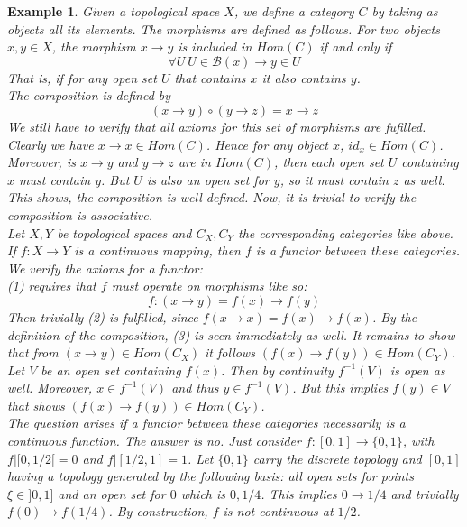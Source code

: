 \documentclass[17pt]{extarticle}
\newtheorem{example}{Example}
\begin{document}
\begin{example}
	Given a topological space $X$, we define a category $C$ by taking as objects all its elements.
	The morphisms are defined as follows. For two objects $x,y\in X$, the morphism $x\rightarrow y$ is included in
	$Hom(C)$ if and only if 
	$$\forall U \ U\in \mathcal{B}(x) \rightarrow y\in U$$
	That is, if for any open set $U$ that contains $x$ it also contains $y$.\\
	The composition is defined by
	$$(x\rightarrow y)\circ (y\rightarrow z) = x\rightarrow z$$
	We still have to verify that all axioms for this set of morphisms are fufilled.\\
	Clearly we have $x\rightarrow x\in Hom(C)$. Hence for any object $x$, $id_x\in Hom(C)$. 
	Moreover, is $x\rightarrow y$ and $y\rightarrow z$ are in $Hom(C)$, then each open set $U$ containing $x$ must
	contain $y$. But $U$ is also an open set for $y$, so it must contain $z$ as well. This shows, the composition is well-defined. Now, it is trivial to verify the composition is associative.\\
	Let $X, Y$ be topological spaces and $C_X, C_Y$ the corresponding categories like above. If $f: X\rightarrow Y$ is a continuous mapping, then $f$ is a functor between these categories. We verify the axioms for a functor:\\
	(1) requires that $f$ must operate on morphisms like so: 
	$$f:(x\rightarrow y)=f(x)\rightarrow f(y)$$
	Then trivially (2) is fulfilled, since $f(x\rightarrow x)=f(x)\rightarrow f(x)$.
	By the definition of the composition, (3) is seen immediately as well. It remains to show that from $(x\rightarrow y)\in Hom(C_X)$ it follows $(f(x)\rightarrow f(y))\in Hom(C_Y)$.\\
	Let $V$ be an open set containing $f(x)$. Then by continuity $f^{-1}(V)$ is open as well. Moreover, $x\in f^{-1}(V)$ and thus $y\in f^{-1}(V)$. But this implies $f(y)\in V$ that shows $(f(x)\rightarrow f(y))\in Hom(C_Y)$.\\
	The question arises if a functor between these categories necessarily is a continuous function. The answer is no. Just consider $f:[0,1]\rightarrow \{0,1\}$, with $f|[0,1/2[=0$ and $f|[1/2, 1]=1$. Let $\{0,1\}$ carry the discrete topology and $[0,1]$ having a topology generated by the following basis: all open sets for points $\xi\in ]0,1]$ and an open set for $0$ which is ${0,1/4}$. This implies $0\rightarrow 1/4$ and trivially $f(0)\rightarrow f(1/4)$. By construction, $f$ is not continuous at $1/2$.
	
	
\end{example}
\end{document}
